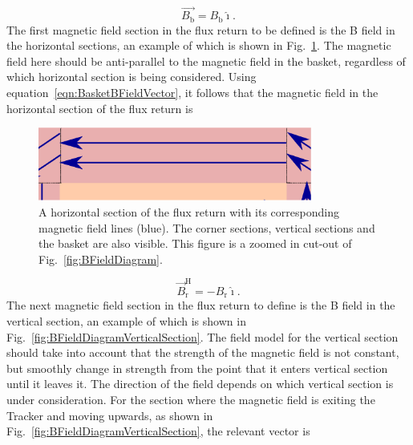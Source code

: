\begin{equation}
  \overrightarrow{B_{\textrm{b}}} = {B_{\textrm{b}}}\hat{\imath}.
  \label{eqn:BasketBFieldVector}
\end{equation}
The first magnetic field section in the flux return to be defined is the B field in the horizontal sections, an example of which is shown in Fig.~\ref{fig:BFieldDiagramHorizontalSection}.  The magnetic field here should be anti-parallel to the magnetic field in the basket, regardless of which horizontal section is being considered.  Using equation~\ref{eqn:BasketBFieldVector}, it follows that the magnetic field in the horizontal section of the flux return is
\begin{figure}
  \centering
  \includegraphics[width=9cm]{images/magnetic_field/BFieldDiagramHorizontalSection}
  \caption{A horizontal section of the flux return with its corresponding magnetic field lines (blue).  The corner sections, vertical sections and the basket are also visible.  This figure is a zoomed in cut-out of Fig.~\ref{fig:BFieldDiagram}.}
  \label{fig:BFieldDiagramHorizontalSection}
\end{figure}
\begin{equation}
  \overrightarrow{B}^{\textrm{H}}_{\textrm{r}} = -{B_{\textrm{r}}}\hat{\imath}.
  \label{eqn:HorizontalReturnBFieldVector}
\end{equation}
The next magnetic field section in the flux return to define is the B field in the vertical section, an example of which is shown in Fig.~\ref{fig:BFieldDiagramVerticalSection}. The field model for the vertical section should take into account that the strength of the magnetic field is not constant, but smoothly change in strength from the point that it enters vertical section until it leaves it.  The direction of the field depends on which vertical section is under consideration.  For the section where the magnetic field is exiting the Tracker and moving upwards, as shown in Fig.~\ref{fig:BFieldDiagramVerticalSection}, the relevant vector is
